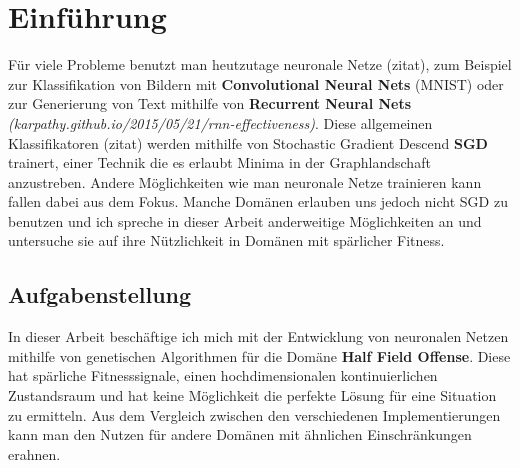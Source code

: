 \chapter{Einführung}


Für viele Probleme benutzt man heutzutage neuronale Netze (zitat), zum Beispiel zur Klassifikation von Bildern mit \textbf{Convolutional Neural Nets} (MNIST) oder zur Generierung von Text mithilfe von \textbf{Recurrent Neural Nets} \textit{(karpathy.github.io/2015/05/21/rnn-effectiveness)}. Diese allgemeinen Klassifikatoren (zitat) werden mithilfe von Stochastic Gradient Descend \textbf{SGD} trainert, einer Technik die es erlaubt Minima in der Graphlandschaft anzustreben. Andere Möglichkeiten wie man neuronale Netze trainieren kann fallen dabei aus dem Fokus. Manche Domänen erlauben uns jedoch nicht SGD zu benutzen und ich spreche in dieser Arbeit anderweitige Möglichkeiten an und untersuche sie auf ihre Nützlichkeit in Domänen mit spärlicher Fitness.

\section{Aufgabenstellung}

In dieser Arbeit beschäftige ich mich mit der Entwicklung von neuronalen Netzen mithilfe von genetischen Algorithmen für die Domäne \textbf{Half Field Offense}. Diese hat spärliche Fitnesssignale, einen hochdimensionalen kontinuierlichen Zustandsraum und hat keine Möglichkeit die perfekte Lösung für eine Situation zu ermitteln. Aus dem Vergleich zwischen den verschiedenen Implementierungen kann man den Nutzen für andere Domänen mit ähnlichen Einschränkungen erahnen. 

